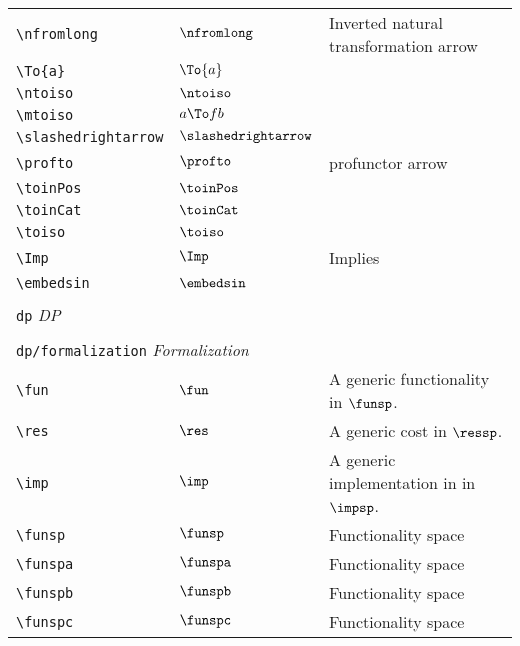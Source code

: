 \begin{longtable}{lll}
 {\color[rgb]{0.5,0.5,0.5}\texttt{\textbackslash nfromlong}} & $\nfromlong$ &  Inverted natural transformation arrow\\ 
 {\color[rgb]{0.5,0.5,0.5}\texttt{\textbackslash To\{a\}}} & $\To{a}$ & \\ 
 {\color[rgb]{0.5,0.5,0.5}\texttt{\textbackslash ntoiso}} & $\ntoiso$ & \\ 
 {\color[rgb]{0.5,0.5,0.5}\texttt{\textbackslash mtoiso}} & $a \To f b$ & \\ 
 {\color[rgb]{0.5,0.5,0.5}\texttt{\textbackslash slashedrightarrow}} & $\slashedrightarrow$ & \\ 
 {\color[rgb]{0.5,0.5,0.5}\texttt{\textbackslash profto}} & $\profto$ &  profunctor arrow\\ 
 {\color[rgb]{0.5,0.5,0.5}\texttt{\textbackslash toinPos}} & $\toinPos$ & \\ 
 {\color[rgb]{0.5,0.5,0.5}\texttt{\textbackslash toinCat}} & $\toinCat$ & \\ 
 {\color[rgb]{0.5,0.5,0.5}\texttt{\textbackslash toiso}} & $\toiso$ & \\ 
 {\color[rgb]{0.5,0.5,0.5}\texttt{\textbackslash Imp}} & $\Imp$ &  Implies\\ 
 {\color[rgb]{0.5,0.5,0.5}\texttt{\textbackslash embedsin}} & $\embedsin$ & \\ 
  &  & \\ 
 \multicolumn{3}{l}{{\color[rgb]{0.5,0.5,0.5}\texttt{dp}} \emph{DP}}\\ 
 \hline
\hline
 &  & \\ 
 \multicolumn{3}{l}{{\color[rgb]{0.5,0.5,0.5}\texttt{dp/formalization}} \emph{Formalization}}\\ 
 \hline
{\color[rgb]{0.5,0.5,0.5}\texttt{\textbackslash fun}} & $\fun$ &  A generic functionality in $\funsp$.\\ 
 {\color[rgb]{0.5,0.5,0.5}\texttt{\textbackslash res}} & $\res$ &  A generic cost in $\ressp$.\\ 
 {\color[rgb]{0.5,0.5,0.5}\texttt{\textbackslash imp}} & $\imp$ &  A generic implementation in in $\impsp$.\\ 
 {\color[rgb]{0.5,0.5,0.5}\texttt{\textbackslash funsp}} & $\funsp$ &  Functionality space\\ 
 {\color[rgb]{0.5,0.5,0.5}\texttt{\textbackslash funspa}} & $\funspa$ &  Functionality space\\ 
 {\color[rgb]{0.5,0.5,0.5}\texttt{\textbackslash funspb}} & $\funspb$ &  Functionality space\\ 
 {\color[rgb]{0.5,0.5,0.5}\texttt{\textbackslash funspc}} & $\funspc$ &  Functionality space\\ 

\end{longtable}
